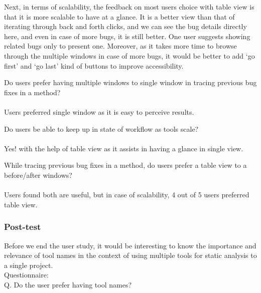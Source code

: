 Next, in terms of scalability, the feedback on most users choice with table view is that it is more scalable to have at a glance. It is a better view than that of iterating through back and forth clicks, and we can see the bug details directly here, and even in case of more bugs, it is still better. One user suggests showing related bugs only to present one. Moreover, as it takes more time to browse through the multiple windows in case of more bugs, it would be better to add ‘go first’ and ‘go last’ kind of buttons to improve accessibility. \\

\begin{myboxi}{{Do users prefer having multiple windows to single window in tracing previous bug fixes in a method?}}
	\\ \\ Users preferred single window as it is easy to perceive results. \\
\end{myboxi}
\clearpage
\begin{myboxi}{{Do users be able to keep up in state of workflow as tools scale?}}
	\\ \\ Yes! with the help of table view as it assists in having a glance in single view. \\
\end{myboxi}

\begin{myboxi}{{While tracing previous bug fixes in a method, do users prefer a table view to a before/after windows?}}
	\\ \\ Users found both are useful, but in case of scalability, 4 out of 5 users preferred table view. \\
\end{myboxi}


\subsubsection{Post-test}

Before we end the user study, it would be interesting to know the importance and relevance of tool names in the context of using multiple tools for static analysis to a single project. \\

Questionnaire: \\
 
Q. Do the user prefer having tool names? \\

